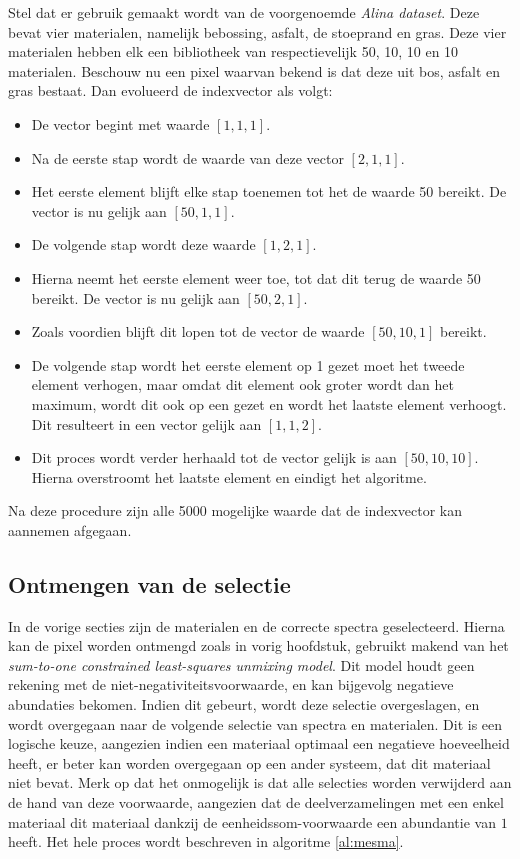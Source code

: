 \documentclass[12pt]{report}
\begin{document}
Stel dat er gebruik gemaakt wordt van de voorgenoemde \textit{Alina dataset}. Deze bevat vier materialen, namelijk bebossing, asfalt, de stoeprand en gras. Deze vier materialen hebben elk een bibliotheek van respectievelijk 50, 10, 10 en 10 materialen. Beschouw nu een pixel waarvan bekend is dat deze uit bos, asfalt en gras bestaat. Dan evolueerd de indexvector als volgt:

\begin{itemize}
\item De vector begint met waarde $[1,1,1]$.
\item Na de eerste stap wordt de waarde van deze vector $[2,1,1]$.
\item Het eerste element blijft elke stap toenemen tot het de waarde 50 bereikt. De vector is nu gelijk aan $[50,1,1]$.
\item De volgende stap wordt deze waarde $[1,2,1]$.
\item Hierna neemt het eerste element weer toe, tot dat dit terug de waarde 50 bereikt. De vector is nu gelijk aan $[50,2,1]$.
\item Zoals voordien blijft dit lopen tot de vector de waarde $[50,10,1]$ bereikt.
\item De volgende stap wordt het eerste element op 1 gezet moet het tweede element verhogen, maar omdat dit element ook groter wordt dan het maximum, wordt dit ook op een gezet en wordt het laatste element verhoogt. Dit resulteert in een vector gelijk aan $[1,1,2]$.
\item Dit proces wordt verder herhaald tot de vector gelijk is aan $[50,10,10]$. Hierna overstroomt het laatste element en eindigt het algoritme. 
\end{itemize}

Na deze procedure zijn alle 5000 mogelijke waarde dat de indexvector kan aannemen afgegaan.

\subsection{Ontmengen van de selectie}

In de vorige secties zijn de materialen en de correcte spectra geselecteerd. Hierna kan de pixel worden ontmengd zoals in vorig hoofdstuk, gebruikt makend van het \textit{sum-to-one constrained least-squares unmixing model}. Dit model houdt geen rekening met de niet-negativiteitsvoorwaarde, en kan bijgevolg negatieve abundaties bekomen. Indien dit gebeurt, wordt deze selectie overgeslagen, en wordt overgegaan naar de volgende selectie van spectra en materialen. Dit is een logische keuze, aangezien indien een materiaal optimaal een negatieve hoeveelheid heeft, er beter kan worden overgegaan op een ander systeem, dat dit materiaal niet bevat. Merk op dat het onmogelijk is dat alle selecties worden verwijderd aan de hand van deze voorwaarde, aangezien dat de deelverzamelingen met een enkel materiaal dit materiaal dankzij de eenheidssom-voorwaarde een abundantie van $1$ heeft. Het hele proces wordt beschreven in algoritme \ref{al:mesma}.
\end{document}
